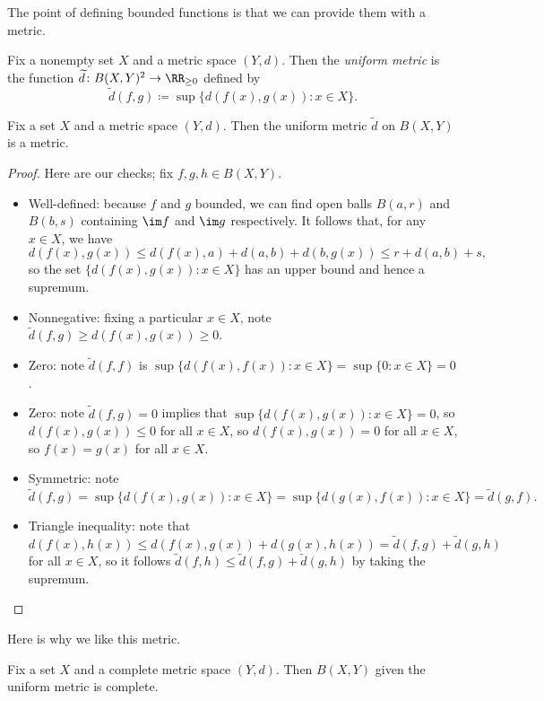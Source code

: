 \documentclass[../notes.tex]{subfiles}
\begin{document}
The point of defining bounded functions is that we can provide them with a metric.
\begin{definition}
	Fix a nonempty set $X$ and a metric space $(Y,d)$. Then the \textit{uniform metric} is the function $\widetilde d\colon B(X,Y)^2\to\RR_{\ge0}$ defined by
	\[\widetilde d(f,g)\coloneqq\sup\{d(f(x),g(x)):x\in X\}.\]
\end{definition}
\begin{lemma}
	Fix a set $X$ and a metric space $(Y,d)$. Then the uniform metric $\widetilde d$ on $B(X,Y)$ is a metric.
\end{lemma}
\begin{proof}
	Here are our checks; fix $f,g,h\in B(X,Y)$.
	\begin{itemize}
		\item Well-defined: because $f$ and $g$ bounded, we can find open balls $B(a,r)$ and $B(b,s)$ containing $\im f$ and $\im g$ respectively. It follows that, for any $x\in X$, we have
		\[d(f(x),g(x))\le d(f(x),a)+d(a,b)+d(b,g(x))\le r+d(a,b)+s,\]
		so the set $\{d(f(x),g(x)):x\in X\}$ has an upper bound and hence a supremum.
		\item Nonnegative: fixing a particular $x\in X$, note $\widetilde d(f,g)\ge d(f(x),g(x))\ge0$.
		\item Zero: note $\widetilde d(f,f)$ is $\sup\{d(f(x),f(x)):x\in X\}=\sup\{0:x\in X\}=0$.
		\item Zero: note $\widetilde d(f,g)=0$ implies that $\sup\{d(f(x),g(x)):x\in X\}=0$, so $d(f(x),g(x))\le0$ for all $x\in X$, so $d(f(x),g(x))=0$ for all $x\in X$, so $f(x)=g(x)$ for all $x\in X$.
		\item Symmetric: note
		\[\widetilde d(f,g)=\sup\{d(f(x),g(x)):x\in X\}=\sup\{d(g(x),f(x)):x\in X\}=\widetilde d(g,f).\]
		\item Triangle inequality: note that
		\[d(f(x),h(x))\le d(f(x),g(x))+d(g(x),h(x))=\widetilde d(f,g)+\widetilde d(g,h)\]
		for all $x\in X$, so it follows $\widetilde d(f,h)\le\widetilde d(f,g)+\widetilde d(g,h)$ by taking the supremum.
		\qedhere
	\end{itemize}
\end{proof}
Here is why we like this metric.
\begin{proposition} \label{prop:completeboundedfuncs}
	Fix a set $X$ and a complete metric space $(Y,d)$. Then $B(X,Y)$ given the uniform metric is complete.
\end{proposition}
\end{document}
